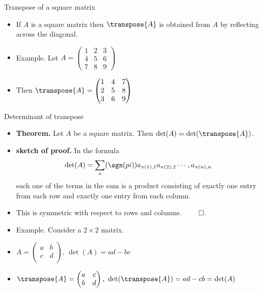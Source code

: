 \documentclass{beamer}
\begin{document}
\begin{frame}{Transpose of a square matrix}
\begin{itemize}
\item If $A$ is a square matrix then $\transpose{A}$ is obtained from $A$
by reflecting across the diagonal.
\item Example. Let
$
A=
\begin{pmatrix}
1 & 2 & 3 \\
4 & 5 & 6 \\
7 & 8 & 9
\end{pmatrix}
$
\item Then
$
\transpose{A} =
\begin{pmatrix}
1 & 4  & 7 \\
2 & 5  & 8\\
3 & 6  & 9\\
\end{pmatrix}
$
\end{itemize}
\end{frame}


\begin{frame}{Determinant of transpose}
\begin{itemize}
\item \textbf{Theorem.} Let $A$ be a square matrix. Then $\det(A) = \det(\transpose{A})$.
\item \textbf{sketch of proof.}  In the formula
$$
\det(A) = \sum_{\pi} (\sgn(pi)) a_{\pi(1),1} a_{\pi(2), 2} \cdots, a_{\pi(n), n}
$$
each one of the terms in the sum is a product consisting of exactly one entry from each row and exactly one entry from each column.
\item This is symmetric with respect to rows and columns. $\qed$.
\item Example. Consider a $2\times 2$ matrix.
\item
$
A =
\begin{pmatrix}
a & b \\
c & d \\
\end{pmatrix}
\text{, }
\det(A) = ad - bc
$
\item
$
\transpose{A} =
\begin{pmatrix}
a & c \\
b & d \\
\end{pmatrix}
\text{, }
\det(\transpose{A}) = ad - cb = \det(A)
$
\end{itemize}
\end{frame}
\end{document}
